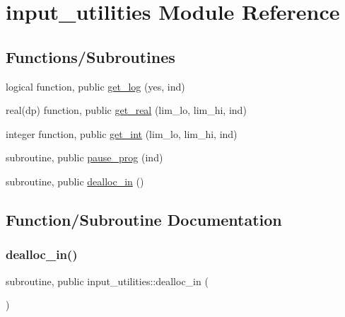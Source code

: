 \hypertarget{namespaceinput__utilities}{}\section{input\+\_\+utilities Module Reference}
\label{namespaceinput__utilities}
\subsection*{Functions/\+Subroutines}
\begin{DoxyCompactItemize}
\item 
logical function, public \hyperlink{namespaceinput__utilities_ad9ce824c30b32041ab70f3fb191f06db}{get\+\_\+log} (yes, ind)
\item 
real(dp) function, public \hyperlink{namespaceinput__utilities_a41fc0c806e12bc722771210cfa1edbd3}{get\+\_\+real} (lim\+\_\+lo, lim\+\_\+hi, ind)
\item 
integer function, public \hyperlink{namespaceinput__utilities_a03e09af96ba6f7e187ea4a1d9b743148}{get\+\_\+int} (lim\+\_\+lo, lim\+\_\+hi, ind)
\item 
subroutine, public \hyperlink{namespaceinput__utilities_a71bd36f063d55ab62c7a37864aef1185}{pause\+\_\+prog} (ind)
\item 
subroutine, public \hyperlink{namespaceinput__utilities_aa0cf7578f9c9ab6470f8bb8d025f1daf}{dealloc\+\_\+in} ()
\end{DoxyCompactItemize}


\subsection{Function/\+Subroutine Documentation}
\mbox{\label{namespaceinput__utilities_aa0cf7578f9c9ab6470f8bb8d025f1daf}} 
\subsubsection{\texorpdfstring{dealloc\+\_\+in()}{dealloc\_in()}}
{\footnotesize\ttfamily subroutine, public input\+\_\+utilities\+::dealloc\+\_\+in (\begin{DoxyParamCaption}{ }\end{DoxyParamCaption})}



